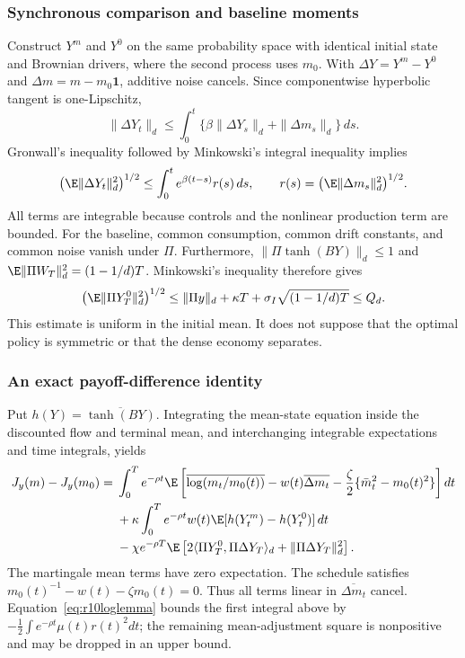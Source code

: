 \subsubsection{Synchronous comparison and baseline moments}
Construct $Y^m$ and $Y^0$ on the same probability space with identical initial state and Brownian drivers, where the second process uses $m_0$. With $\Delta Y=Y^m-Y^0$ and $\Delta m=m-m_0\bm1$, additive noise cancels. Since componentwise hyperbolic tangent is one-Lipschitz,
\[
 \|\Delta Y_t\|_d\leq\int_0^t
       \{\beta\|\Delta Y_s\|_d+\|\Delta m_s\|_d\}\,ds.
\]
Gronwall's inequality followed by Minkowski's integral inequality implies
\begin{equation}\label{eq:r10stability}
 \bigl(\E\|\Delta Y_t\|_d^2\bigr)^{1/2}
 \leq\int_0^t e^{\beta(t-s)}r(s)\,ds,
 \qquad r(s)=\bigl(\E\|\Delta m_s\|_d^2\bigr)^{1/2}.
\end{equation}
All terms are integrable because controls and the nonlinear production term are bounded. For the baseline, common consumption, common drift constants, and common noise vanish under $\Pi$. Furthermore, $\|\Pi\tanh(BY)\|_d\leq1$ and
$\E\|\Pi W_T\|_d^2=(1-1/d)T$. Minkowski's inequality therefore gives
\begin{equation}\label{eq:r10moment}
 \bigl(\E\|\Pi Y_T^0\|_d^2\bigr)^{1/2}
 \leq\|\Pi y\|_d+\kappa T+\sigma_I\sqrt{(1-1/d)T}
 \leq Q_d.
\end{equation}
This estimate is uniform in the initial mean. It does not suppose that the optimal policy is symmetric or that the dense economy separates.

\subsubsection{An exact payoff-difference identity}
Put $h(Y)=\overline{\tanh(BY)}$. Integrating the mean-state equation inside the discounted flow and terminal mean, and interchanging integrable expectations and time integrals, yields
\begin{align}
 J_y(m)-J_y(m_0)
 ={}&\int_0^T e^{-\rho t}\E\left[
       \overline{\log(m_t/m_0(t))}-w(t)\overline{\Delta m_t}
       -\frac\zeta2\{\bar m_t^2-m_0(t)^2\}\right]dt\notag\\
 &+\kappa\int_0^T e^{-\rho t}w(t)
        \E[h(Y_t^m)-h(Y_t^0)]\,dt\notag\\
 &-\chi e^{-\rho T}\E\left[
       2\langle\Pi Y_T^0,\Pi\Delta Y_T\rangle_d
           +\|\Pi\Delta Y_T\|_d^2\right].\label{eq:r10identity}
\end{align}
The martingale mean terms have zero expectation. The schedule satisfies
$m_0(t)^{-1}-w(t)-\zeta m_0(t)=0$. Thus all terms linear in $\overline{\Delta m_t}$ cancel. Equation~\eqref{eq:r10loglemma} bounds the first integral above by
$-\frac12\int e^{-\rho t}\mu(t)r(t)^2dt$; the remaining mean-adjustment square is nonpositive and may be dropped in an upper bound.

